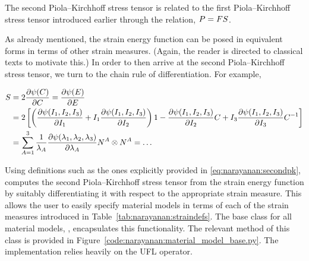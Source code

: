 \noindent The second Piola--Kirchhoff stress tensor is related to the
first Piola--Kirchhoff stress tensor introduced earlier through the
relation, $\mbox{$ P$} = \mbox{$ F$} \mbox{$ S$}$.

As already mentioned, the strain energy function can be posed in
equivalent forms in terms of other strain measures. (Again, the reader
is directed to classical texts to motivate this.) In order to then
arrive at the second Piola--Kirchhoff stress tensor, we turn to the
chain rule of differentiation. For example,

\begin{equation}
\begin{split}
  \mbox{$ S$} & = 2 \frac{\partial \psi(\mbox{$ C$})}{\partial \mbox{$ C$}} = \frac{\partial
    \psi(\mbox{$ E$})}{\partial \mbox{$ E$}}\\
      & = 2\left[\left(\frac{\partial \psi (I_{1}, I_{2},
            I_{3})}{\partial I_{1}} + I_{1} \frac{\partial \psi (I_{1}, I_{2},
            I_{3})}{\partial I_{2}} \right) {1} - \frac{\partial \psi (I_{1},
          I_{2}, I_{3})}{\partial I_{2}} \mbox{$ C$} + I_{3} \frac{\partial \psi (I_{1},
          I_{2}, I_{3})}{\partial I_{3}} \mbox{$ C$}^{-1} \right]\\
      & = \sum_{A = 1}^{3}
      \frac{1}{\lambda_{A}} \frac{\partial \psi(\lambda_{1},
        \lambda_{2}, \lambda_{3})}{\partial
        \lambda_{A}} \mbox{$ N$}^{A}\otimes\mbox{$ N$}^{A} = \ldots
\end{split}
\label{eq:narayanan:secondpk}
\end{equation}

Using definitions such as the ones explicitly provided in
\eqref{eq:narayanan:secondpk}, \twist{} computes the second
Piola--Kirchhoff stress tensor from the strain energy function by
suitably differentiating it with respect to the appropriate strain
measure. This allows the user to easily specify material models in
terms of each of the strain measures introduced in
Table~\ref{tab:narayanan:straindefs}. The base class for all material
models, , encapsulates this functionality. The
relevant method of this class is provided in
Figure~\ref{code:narayanan:material_model_base.py}. The implementation
relies heavily on the UFL  operator.


